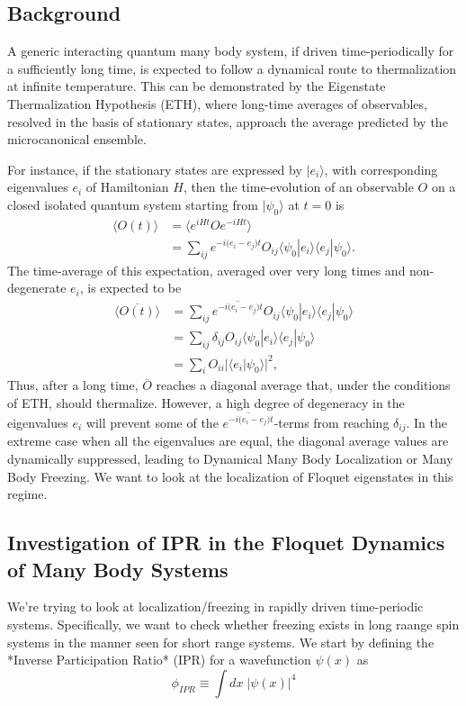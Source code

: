 \documentclass{article}
\begin{document}
\subsection{Background}
A generic interacting quantum many body system, if driven time-periodically for a sufficiently long time, is expected to follow a dynamical route to thermalization at infinite temperature. This can be demonstrated by the Eigenstate Thermalization Hypothesis (ETH), where long-time averages of observables, resolved in the basis of stationary states, approach the average predicted by the microcanonical ensemble. 

For instance, if the stationary states are expressed by $|e_i\rangle$, with corresponding eigenvalues $e_i$ of Hamiltonian $H$, then the time-evolution of an observable $O$ on a closed isolated quantum system starting from $|\psi_0\rangle$ at $t=0$ is
\begin{align*}
\langle O (t) \rangle &= \langle e^{iHt}Oe^{-iHt}\rangle\\
                      &= \sum_{ij}e^{-i\big(e_i-e_j\big)t} O_{ij} \langle\psi_0|e_i\rangle \langle e_j|\psi_0\rangle.
\end{align*}
The time-average of this expectation, averaged over very long times and non-degenerate $e_i$, is expected to be
\begin{align*}
\overline{\langle O (t) \rangle} &= \sum_{ij}\overline{e^{-i\big(e_i-e_j\big)t}}O_{ij} \langle\psi_0|e_i\rangle \langle e_j|\psi_0\rangle\\
 &= \sum_{ij}\delta_{ij}O_{ij} \langle\psi_0|e_i\rangle \langle e_j|\psi_0\rangle\\
 &=\sum_i O_{ii}\bigg\vert \langle e_i\vert\psi_0\rangle \bigg\vert^2,
\end{align*}
Thus, after a long time, $\overline{O}$ reaches a diagonal average that, under the conditions of ETH, should thermalize. However, a high degree of degeneracy in the eigenvalues $e_i$ will prevent some of the $\overline{e^{-i\big(e_i-e_j\big)t}}$-terms from reaching $\delta_{ij}$. In the extreme case when all the eigenvalues are equal, the diagonal average values are dynamically suppressed, leading to Dynamical Many Body Localization or Many Body Freezing. We want to look at the localization of Floquet eigenstates in this regime.


\subsection{Investigation of IPR in the Floquet Dynamics of Many Body Systems}
We're trying to look at localization/freezing in rapidly driven time-periodic systems. Specifically, we want to check whether freezing exists in long raange spin systems in the manner seen for short range systems. We start by defining the *Inverse Participation Ratio* (IPR) for a wavefunction $\psi(x)$ as 
\begin{equation*}
\phi_{IPR}\equiv \int dx\;\vert\psi(x)\vert^4
\end{equation*}
\end{document}
